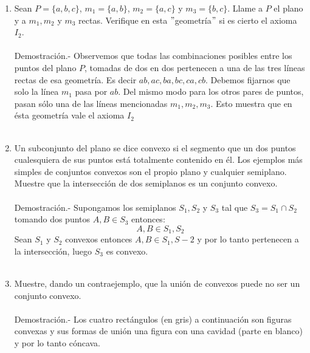 \documentclass[10pt]{article}
\begin{document}
\begin{enumerate}
    \item Sean $P=\lbrace a,b,c \rbrace$, $m_1=\lbrace a,b \rbrace$, $m_2=\lbrace a,c \rbrace$ y $m_3=\lbrace b,c \rbrace$. Llame a $P$ el plano y a $m_1,m_2$ y $m_3$ rectas. Verifique en esta $"$geometría$"$ si es cierto el axioma $I_2$.\\\\
    Demostración.-\; Observemos que todas las combinaciones posibles entre los puntos del plano $P$, tomadas de dos en dos pertenecen a una de las tres líneas rectas de esa geometría. Es decir $ab,ac,ba,bc,ca,cb$. Debemos fijarnos que solo la línea $m_1$ pasa por $ab$. Del mismo modo para los otros pares de puntos, pasan sólo una de las líneas mencionadas $m_1,m_2,m_3$. Esto muestra que en ésta geometría vale el axioma $I_2$\\\\

    \item Un subconjunto del plano se dice convexo si el segmento que un dos puntos cualesquiera de sus puntos está totalmente contenido en él. Los ejemplos más simples de conjuntos convexos son el propio plano y cualquier semiplano. Muestre que la intersección de dos semiplanos es un conjunto convexo.\\\\
    Demostración.-\; Supongamos los semiplanos $S_1,S_2$ y $S_3$ tal que $S_3 = S_1 \cap S_2$ tomando dos puntos $A, B \in S_3$ entonces: $$A,B \in S_1,S_2$$ Sean $S_1$ y $S_2$ convexos entonces $A,B \in S_1,S-2$ y por lo tanto pertenecen  a la intersección, luego $S_3$ es convexo.\\\\


    \item Muestre, dando un contraejemplo, que la unión de convexos puede no ser un conjunto convexo.\\\\
    Demostración.-\; Los cuatro rectángulos (en gris) a continuación son figuras convexas y sus formas de unión una figura con una cavidad (parte en blanco) y por lo tanto cóncava.


\end{enumerate}
\end{document}
